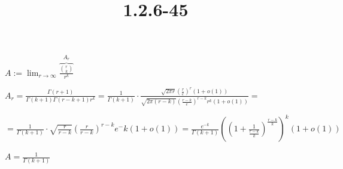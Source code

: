 \documentclass{article}
\title{1.2.6-45}
\begin{document}
\maketitle

$A := \lim_{r \to \infty} \overbrace{\frac{\binom{r}{k}}{r^k}}^{A_r}$

$A_r = \frac{\Gamma(r+1)}{\Gamma(k+1)\Gamma(r-k+1) r^k} = \frac{1}{\Gamma(k+1)} \cdot \frac{\sqrt{2 \pi r} (\frac{r}{e})^r (1 + o(1))}{\sqrt{2 \pi (r-k)} (\frac{r-k}{e})^{r-k} r^k (1 + o(1))} =$

$= \frac{1}{\Gamma(k+1)} \cdot \sqrt{\frac{r}{r-k}} (\frac{r}{r-k})^{r-k} e^-k (1+o(1)) = \frac{e^{-k}}{\Gamma(k+1)} ((1 + \frac{1}{\frac{r-k}{k}})^{\frac{r-k}{k}})^k (1+o(1))$

$A = \frac{1}{\Gamma(k+1)}$
\end{document}
